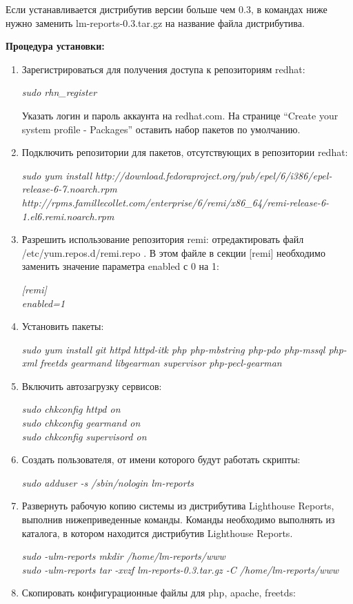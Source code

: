Если устанавливается дистрибутив версии больше чем 0.3, в командах ниже нужно заменить lm-reports-0.3.tar.gz на название файла дистрибутива.

\textbf{Процедура установки:}
\begin{enumerate}
\item{
Зарегистрироваться для получения доступа к репозиториям redhat:

\textit{sudo rhn\_register
}

Указать логин и пароль аккаунта на redhat.com. На странице “Create your system profile - Packages” оставить набор пакетов по умолчанию.
}
\item{
Подключить репозитории для пакетов, отсутствующих в репозитории redhat:

\textit{sudo yum install http://download.fedoraproject.org/pub/epel/6/i386/epel-release-6-7.noarch.rpm http://rpms.famillecollet.com/enterprise/6/remi/x86\_64/remi-release-6-1.el6.remi.noarch.rpm
}

}
\item{
Разрешить использование репозитория remi: отредактировать файл /etc/yum.repos.d/remi.repo . В этом файле в секции [remi] необходимо заменить значение параметра enabled с 0 на 1:

\textit{[remi]\\
enabled=1
}
}
\item{
Установить пакеты:

\textit{sudo yum install git httpd httpd-itk php php-mbstring php-pdo php-mssql php-xml freetds gearmand libgearman supervisor php-pecl-gearman
}
}
\item{
Включить автозагрузку сервисов:

\textit{sudo chkconfig httpd on\\
sudo chkconfig gearmand on\\
sudo chkconfig supervisord on\\
}
}
\item{
Создать пользователя, от имени которого будут работать скрипты:

\textit{sudo adduser -s /sbin/nologin lm-reports
}
}
\item{
Развернуть рабочую копию системы из дистрибутива Lighthouse Reports, выполнив нижеприведенные команды. Команды необходимо выполнять из каталога, в котором находится дистрибутив Lighthouse Reports. 

\textit{sudo -ulm-reports mkdir /home/lm-reports/www\\
sudo -ulm-reports tar -xvzf lm-reports-0.3.tar.gz -C /home/lm-reports/www
}
}
\item{
Скопировать конфигурационные файлы для php, apache, freetds:

}
\end{enumerate}
